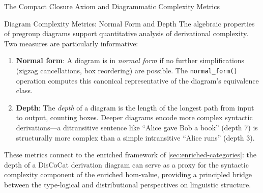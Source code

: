 \documentclass[
  ignorenonframetext,
]{beamer}
\begin{document}
\begin{frame}[fragile]{The Compact Closure Axiom and Diagrammatic
Complexity Metrics}
\begin{block}{Diagram Complexity Metrics: Normal Form and Depth}
\protect{}\label{diagram-complexity-metrics-normal-form-and-depth}
The algebraic properties of pregroup diagrams support quantitative
analysis of derivational complexity. Two measures are particularly
informative:

\begin{enumerate}
\item
  \textbf{Normal form}: A diagram is in \emph{normal form} if no further
  simplifications (zigzag cancellations, box reordering) are possible.
  The \texttt{normal\_form()} operation computes this canonical
  representative of the diagram's equivalence class.
\item
  \textbf{Depth}: The \emph{depth} of a diagram is the length of the
  longest path from input to output, counting boxes. Deeper diagrams
  encode more complex syntactic derivations---a ditransitive sentence
  like ``Alice gave Bob a book'' (depth 7) is structurally more complex
  than a simple intransitive ``Alice runs'' (depth 3).
\end{enumerate}

These metrics connect to the enriched framework of
\autoref{sec:enriched-categories}: the depth of a DisCoCat derivation
diagram can serve as a proxy for the syntactic complexity component of
the enriched hom-value, providing a principled bridge between the
type-logical and distributional perspectives on linguistic structure.
\end{block}
\end{frame}
\end{document}

